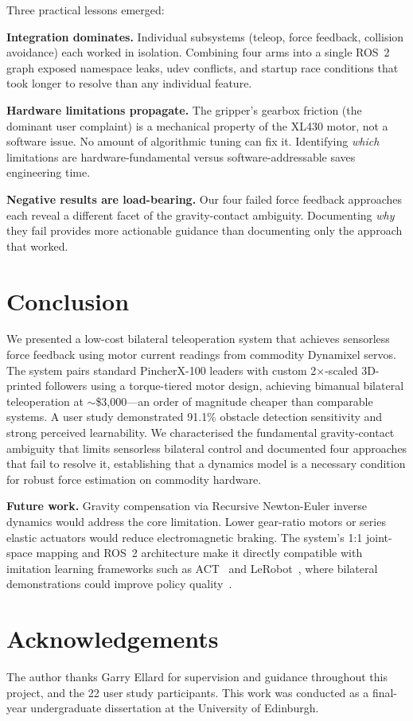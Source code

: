 \documentclass[conference]{IEEEtran}
\begin{document}
Three practical lessons emerged:

\textbf{Integration dominates.} Individual subsystems (teleop, force feedback, collision avoidance) each worked in isolation. Combining four arms into a single ROS~2 graph exposed namespace leaks, udev conflicts, and startup race conditions that took longer to resolve than any individual feature.

\textbf{Hardware limitations propagate.} The gripper's gearbox friction (the dominant user complaint) is a mechanical property of the XL430 motor, not a software issue. No amount of algorithmic tuning can fix it. Identifying \emph{which} limitations are hardware-fundamental versus software-addressable saves engineering time.

\textbf{Negative results are load-bearing.} Our four failed force feedback approaches each reveal a different facet of the gravity-contact ambiguity. Documenting \emph{why} they fail provides more actionable guidance than documenting only the approach that worked.

\section{Conclusion}

We presented a low-cost bilateral teleoperation system that achieves sensorless force feedback using motor current readings from commodity Dynamixel servos. The system pairs standard PincherX-100 leaders with custom 2$\times$-scaled 3D-printed followers using a torque-tiered motor design, achieving bimanual bilateral teleoperation at $\sim$\$3,000---an order of magnitude cheaper than comparable systems. A user study demonstrated 91.1\% obstacle detection sensitivity and strong perceived learnability. We characterised the fundamental gravity-contact ambiguity that limits sensorless bilateral control and documented four approaches that fail to resolve it, establishing that a dynamics model is a necessary condition for robust force estimation on commodity hardware.

\textbf{Future work.} Gravity compensation via Recursive Newton-Euler inverse dynamics would address the core limitation. Lower gear-ratio motors or series elastic actuators would reduce electromagnetic braking. The system's 1:1 joint-space mapping and ROS~2 architecture make it directly compatible with imitation learning frameworks such as ACT~\cite{zhao2023aloha} and LeRobot~\cite{lerobot2025}, where bilateral demonstrations could improve policy quality~\cite{kobayashi2024}.

\section*{Acknowledgements}
The author thanks Garry Ellard for supervision and guidance throughout this project, and the 22 user study participants. This work was conducted as a final-year undergraduate dissertation at the University of Edinburgh.



\end{document}
